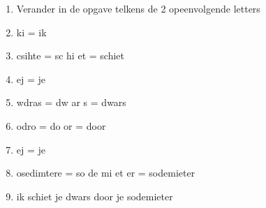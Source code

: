 \begin{enumerate}
  \item Verander in de opgave telkens de 2 opeenvolgende letters
  \item ki = ik
  \item csihte = sc hi et = schiet
  \item ej = je
  \item wdras = dw ar s = dwars
  \item odro = do or = door
  \item ej = je
  \item osedimtere = so de mi et er = sodemieter
  \item ik schiet je dwars door je sodemieter
\end{enumerate}